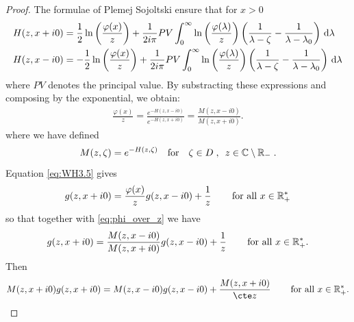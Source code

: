 \begin{proof}
The formulae of Plemej Sojoltski \cite{sokhotski1873definite} ensure that for $x > 0$
    \begin{align*}
        H(z,x+i0) &= \frac{1}{2} \ln\left(\frac{\varphi(x)}{z}\right) + \frac{1}{2i\pi } PV\int_0^\infty \ln\left(\frac{\varphi(\lambda)}{z}\right) \left( \frac{1}{\lambda-\zeta} - \frac{1}{\lambda-\lambda_0}\right) \,\mathrm{d} \lambda\\
        H(z,x-i0) &= -\frac{1}{2} \ln\left(\frac{\varphi(x)}{z}\right) + \frac{1}{2i\pi } PV\int_0^\infty \ln\left(\frac{\varphi(\lambda)}{z}\right)\left( \frac{1}{\lambda-\zeta} - \frac{1}{\lambda-\lambda_0}\right) \,\mathrm{d} \lambda
    \end{align*}
where $PV$ denotes the principal value. 
By substracting these expressions and composing by the exponential, we obtain:
\begin{align}
    \label{eq:phi_over_z}
    \frac{\varphi(x)}{z}
    = \frac{e^{-H(z,x-i0)}}{e^{-H(z,x+i0)}} 
    = \frac{M(z,x-i0)}{M(z,x+i0)}.
\end{align}
where we have defined
\begin{equation}
    M(z,\zeta) = e^{-H(z,\zeta)}
    \quad \text{for} \quad
    \zeta \in D
    \; , \enspace z \in \mathbb{C} \setminus \mathbb{R}_- \; .
    \label{def:M}
\end{equation}
Equation \eqref{eq:WH3.5} gives
\begin{align*}
    g(z, x+i0) = \frac{\varphi(x)}{z} g(z, x-i0) + \frac{1}{z} \, \qquad \text{for all $x\in\mathbb{R}_+^*$}
\end{align*}
so that together with \eqref{eq:phi_over_z} we have
\begin{align*}
    g(z, x+i0) = \frac{M(z,x-i0)}{M(z,x+i0)} g(z, x-i0) + \frac{1}{z} \, \qquad \text{for all $x\in\mathbb{R}_+^*$}.
\end{align*}
Then 
\begin{align*}
    M(z,x+i0)g(z, x+i0) = M(z,x-i0)g(z, x-i0) + \frac{M(z,x+i0)}{\cte  z} \, \qquad \text{for all $x\in\RR_+^*$}.
\end{align*}


\end{proof}
